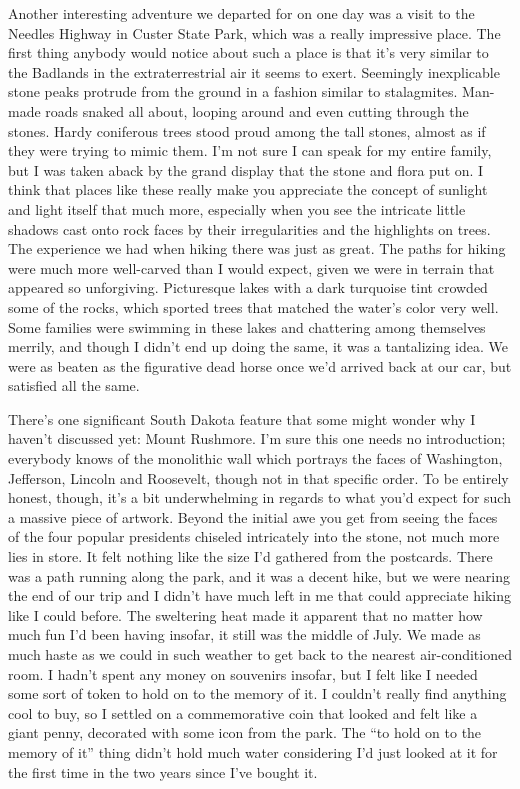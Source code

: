 \documentclass[12pt]{article}
\begin{document}
Another interesting adventure we departed for on one day was a visit to the Needles Highway in Custer State Park, which was a really impressive place.  The first thing anybody would notice about such a place is that it's very similar to the Badlands in the extraterrestrial air it seems to exert.  Seemingly inexplicable stone peaks protrude from the ground in a fashion similar to stalagmites.  Man-made roads snaked all about, looping around and even cutting through the stones.  Hardy coniferous trees stood proud among the tall stones, almost as if they were trying to mimic them.  I'm not sure I can speak for my entire family, but I was taken aback by the grand display that the stone and flora put on.  I think that places like these really make you appreciate the concept of sunlight and light itself that much more, especially when you see the intricate little shadows cast onto rock faces by their irregularities and the highlights on trees.  The experience we had when hiking there was just as great.  The paths for hiking were much more well-carved than I would expect, given we were in terrain that appeared so unforgiving.  Picturesque lakes with a dark turquoise tint crowded some of the rocks, which sported trees that matched the water's color very well.  Some families were swimming in these lakes and chattering among themselves merrily, and though I didn't end up doing the same, it was a tantalizing idea.  We were as beaten as the figurative dead horse once we'd arrived back at our car, but satisfied all the same.

There's one significant South Dakota feature that some might wonder why I haven't discussed yet:  Mount Rushmore.  I'm sure this one needs no introduction;  everybody knows of the monolithic wall which portrays the faces of Washington, Jefferson, Lincoln and Roosevelt, though not in that specific order.  To be entirely honest, though, it's a bit underwhelming in regards to what you'd expect for such a massive piece of artwork.  Beyond the initial awe you get from seeing the faces of the four popular presidents chiseled intricately into the stone, not much more lies in store.  It felt nothing like the size I'd gathered from the postcards.  There was a path running along the park, and it was a decent hike, but we were nearing the end of our trip and I didn't have much left in me that could appreciate hiking like I could before.  The sweltering heat made it apparent that no matter how much fun I'd been having insofar, it still was the middle of July.  We made as much haste as we could in such weather to get back to the nearest air-conditioned room.  I hadn't spent any money on souvenirs insofar, but I felt like I needed some sort of token to hold on to the memory of it.  I couldn't really find anything cool to buy, so I settled on a commemorative coin that looked and felt like a giant penny, decorated with some icon from the park.  The ``to hold on to the memory of it'' thing didn't hold much water considering I'd just looked at it for the first time in the two years since I've bought it.
\end{document}
